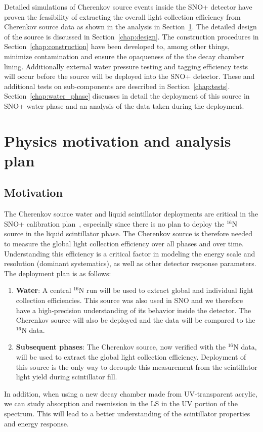 Detailed simulations of Cherenkov source events inside the SNO+ detector have proven the feasibility of extracting the overall light collection efficiency from Cherenkov source data as shown in the analysis in Section~\ref{chap:motivation}. The detailed design of the source is discussed in Section~\ref{chap:design}. The construction procedures in Section~\ref{chap:construction} have been developed to, among other things, minimize contamination and ensure the opaqueness of the the decay chamber lining. Additionally external water pressure testing and tagging efficiency tests will occur before the source will be deployed into the SNO+ detector. These and additional tests on sub-components are described in Section~\ref{chap:tests}. Section~\ref{chap:water_phase} discusses in detail the deployment of this source in SNO+ water phase and an analysis of the data taken during the deployment.


\section{Physics motivation and analysis plan}
\label{chap:motivation}

\subsection{Motivation}
The Cherenkov source water and liquid scintillator deployments are critical in the SNO+ calibration plan~\cite{gann:2013}, especially since there is no plan to deploy the $^{16}$N source in the liquid scintillator phase. The Cherenkov source is therefore needed to measure the global light collection efficiency over all phases and over time. Understanding this efficiency is a critical factor in modeling the energy scale and resolution (dominant systematics), as well as other detector response parameters. The deployment plan is as follows: 
\begin{enumerate}
    \item {\bf Water}: A central $^{16}$N run will be used to extract global and individual light collection efficiencies. This source was also used in SNO and we therefore have a high-precision understanding of its behavior inside the detector. The Cherenkov source will also be deployed and the data will be compared to the $^{16}$N data.
    \item {\bf Subsequent phases}: The Cherenkov source, now verified with the $^{16}$N data, will be used to extract the global light collection efficiency. Deployment of this source is the only way to decouple this measurement from the scintillator light yield during scintillator fill.
\end{enumerate} 
In addition, when using a new decay chamber made from UV-transparent acrylic, we can study absorption and reemission in the LS in the UV portion of the spectrum. This will lead to a better understanding of the scintillator properties and energy response.

